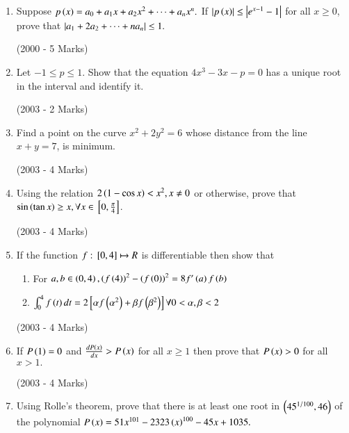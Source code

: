\documentclass[journal]{IEEEtran}
\begin{document}
\begin{enumerate}
   
\item Suppose $p\left(x\right)=a_{0}+a_{1}x+a_{2}x^{2}+\dots +a_{n}x^{n}.$ If $\left\vert p\left(x\right)\right\vert\leq\left\vert e^{x-1}-1\right\vert$ for all $x\geq0$, prove that $\left\vert a_{1}+2a_{2
}+\dots+na_{n}\right\vert\leq1.$

 \hfill{(2000 - 5 Marks)}\\
 \item Let $-1\leq p\leq1.$ Show that the equation $4x^{3}-3x-p=0$ has a unique root in the interval  and identify it.

 \hfill{(2003 - 2 Marks)}\\
 
 \item Find a point on the curve $x^{2}+2y^{2}=6$ whose distance from the line $x+y=7$, is minimum.

 \hfill{(2003 - 4 Marks)}\\
 
\item Using the relation $2\left(1-\cos x\right)<x^{2},x\neq0$ or otherwise, prove that $\sin \left(\tan x\right)\geq x, \forall x \in{}\left[0, \frac{\pi}{4}\right]$.

 \hfill{(2003 - 4 Marks)}\\

\item If the function $f:{}\left[0,4\right]\mapsto R$ is differentiable then show that 
 \begin{enumerate}
 
  \item For $a,b \in \left(0,4\right),\left(f\left(4\right)\right)^{2}-\left(f\left(0\right)\right)^{2}=8f^{\prime}\left(a\right)f\left(b\right)$
  \item $\int_{0}^{4} f\left(t\right)dt=2{}\left[\alpha f\left(\alpha^{2}\right)+\beta f\left(\beta^{2}\right)\right]\forall0<\alpha, \beta <2$ \\
  
\end{enumerate}

\hfill{(2003 - 4 Marks)}\\

\item If $P\left(1\right)=0$ and $\frac{dP\left(x\right)}{dx}>P\left(x\right)$ for all $x\geq 1$ then prove that $P\left(x\right)>0$ for all $x>1.$

\hfill{(2003 - 4 Marks)}\\

\item Using Rolle's theorem, prove that there is at least one root in $\left(45^{1/100},46\right)$ of the polynomial 
$P\left(x\right)=51x^{101}-2323\left(x\right)^{100}-45x+1035.$


\end{enumerate}
\end{document}

